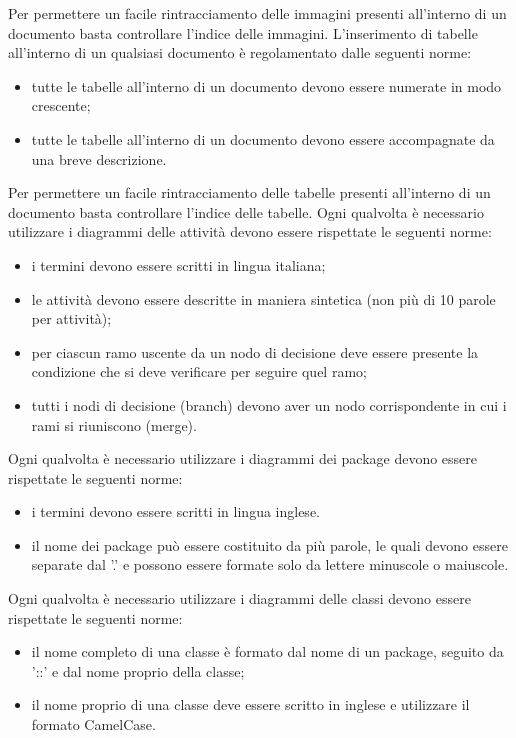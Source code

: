 					Per permettere un facile rintracciamento delle immagini presenti all’interno di un documento basta controllare l’indice delle immagini.
					L’inserimento di tabelle all’interno di un qualsiasi documento è regolamentato dalle seguenti norme:
					\begin{itemize}
						\item tutte le tabelle all’interno di un documento devono essere numerate in modo crescente;
						\item tutte le tabelle all’interno di un documento devono essere accompagnate da una breve descrizione.
					\end{itemize}
					Per permettere un facile rintracciamento delle tabelle presenti all’interno di un documento basta controllare l’indice delle tabelle.
				 \label{sec:UML}
					Ogni qualvolta è necessario utilizzare i diagrammi delle attività devono essere rispettate le seguenti norme:
					\begin{itemize}
					\item i termini devono essere scritti in lingua italiana;
					\item le attività devono essere descritte in maniera sintetica (non più di 10 parole per attività);
					\item per ciascun ramo uscente da un nodo di decisione deve essere presente la condizione che si deve verificare per seguire quel ramo;
					\item tutti i nodi di decisione (branch) devono aver un nodo corrispondente in cui i rami si riuniscono (merge).
					\end{itemize}
					Ogni qualvolta è necessario utilizzare i diagrammi dei package devono essere rispettate le seguenti norme:
					\begin{itemize}
					\item i termini devono essere scritti in lingua inglese.
					\item il nome dei package può essere costituito da più parole, le quali devono essere separate dal '.' e possono essere formate solo da lettere minuscole o maiuscole.
					\end{itemize}
					Ogni qualvolta è necessario utilizzare i diagrammi delle classi devono essere rispettate le seguenti norme:
					\begin{itemize}
					\item il nome completo di una classe è formato dal nome di un package, seguito da '::' e dal nome proprio della classe;
					\item il nome proprio di una classe deve essere scritto in inglese e utilizzare il formato CamelCase.
					\end{itemize}		

